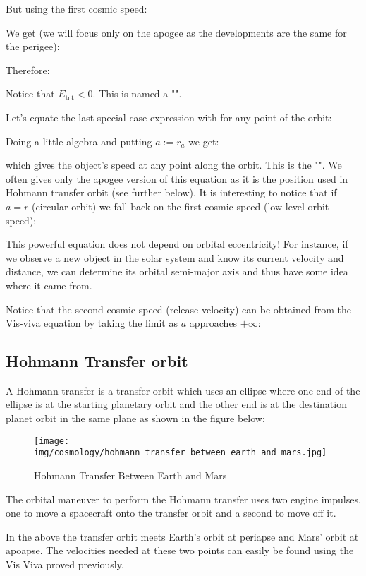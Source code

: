 	But using the first cosmic speed:
	
	We get (we will focus only on the apogee as the developments are the same for the perigee):
	
	Therefore:
	
	Notice that $E_\text{tot} < 0$. This is named a "".
	
	Let's equate the last special case expression with for any point of the orbit:
	
	Doing a little algebra and putting $a:=r_a$ we get:
	
	which gives the object's speed at any point along the orbit. This is the "". We often gives only the apogee version of this equation as it is the position used in Hohmann transfer orbit (see further below). It is interesting to notice that if $a=r$ (circular orbit) we fall back on the first cosmic speed (low-level orbit speed):
	
	This powerful equation does not depend on orbital eccentricity! For instance, if we observe a new object in the solar system and know its current velocity and distance, we can determine its orbital semi-major axis and thus have some idea where it came from.	
		
	Notice that the second cosmic speed (release velocity) can be obtained from the Vis-viva equation by taking the limit as $a$ approaches $+\infty$:
	
	
	\pagebreak
	\subsection{Hohmann Transfer orbit}
	 A Hohmann transfer is a transfer orbit which uses an ellipse where one end of the ellipse is at the starting planetary orbit and the other end is at the destination planet orbit in the same plane as shown in the figure below:
	\begin{figure}[H]
		\centering
		\texttt{[image: img/cosmology/hohmann\_transfer\_between\_earth\_and\_mars.jpg]}
		\caption{Hohmann Transfer Between Earth and Mars}
	\end{figure}
	The orbital maneuver to perform the Hohmann transfer uses two engine impulses, one to move a spacecraft onto the transfer orbit and a second to move off it.
	
	 In the above the transfer orbit meets Earth's orbit at periapse and Mars' orbit at apoapse. The velocities needed at these two points can easily be found using the Vis Viva proved previously.
	 
